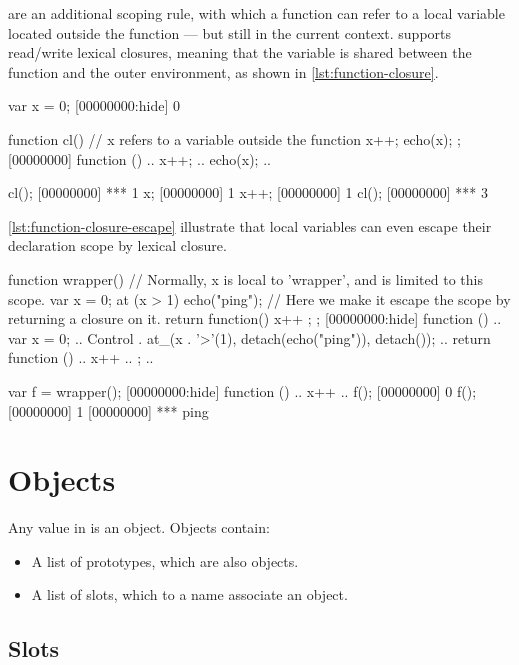  are an additional scoping rule, with which a function
can refer to a local variable located outside the function --- but still
in the current context. \us supports read/write lexical closures,
meaning that the variable is shared between the function and the outer
environment, as shown in \autoref{lst:function-closure}.

\begin{urbiscript}[caption=Lexical closure,
  label=lst:function-closure,float=\floatpos]
var x = 0;
[00000000:hide] 0

function cl()
{
  // x refers to a variable outside the function
  x++;
  echo(x);
};
[00000000] function () {
..  x++;
..  echo(x);
..}

cl();
[00000000] *** 1
x;
[00000000] 1
x++;
[00000000] 1
cl();
[00000000] *** 3
\end{urbiscript}

\autoref{lst:function-closure-escape} illustrate that local variables can even
escape their declaration scope by lexical closure.

\begin{urbiscript}[caption=Local variable escaping its scope by
  lexical closure.,label=lst:function-closure-escape,float=\floatpos]
function wrapper()
{
  // Normally, x is local to 'wrapper', and is limited to this scope.
  var x = 0;
  at (x > 1)
    echo("ping");
  // Here we make it escape the scope by returning a closure on it.
  return function() { x++ };
};
[00000000:hide] function () {
..  var x = 0;
..  Control . at_(x . '>'(1), detach(echo("ping")), detach({}));
..  return function () {
..    x++
..  };
..}

var f = wrapper();
[00000000:hide] function () {
..  x++
..}
f();
[00000000] 0
f();
[00000000] 1
[00000000] *** ping
\end{urbiscript}

\FloatBarrier
\section{Objects}

Any value in \us is an object. Objects contain:

\begin{itemize}
\item A list of prototypes, which are also objects.
\item A list of slots, which to a name associate an object.
\end{itemize}

\subsection{Slots}

